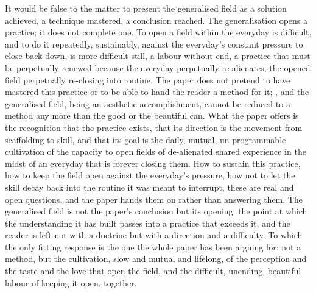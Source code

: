 It would be false to the matter to present the generalised field as a solution achieved, a technique mastered, a conclusion reached. The generalisation opens a practice; it does not complete one. To open a field within the everyday is difficult, and to do it repeatedly, sustainably, against the everyday's constant pressure to close back down, is more difficult still, a labour without end, a practice that must be perpetually renewed because the everyday perpetually re-alienates, the opened field perpetually re-closing into routine. The paper does not pretend to have mastered this practice or to be able to hand the reader a method for it; , and the generalised field, being an aesthetic accomplishment, cannot be reduced to a method any more than the good or the beautiful can. What the paper offers is the recognition that the practice exists, that its direction is the movement from scaffolding to skill, and that its goal is the daily, mutual, un-programmable cultivation of the capacity to open fields of de-alienated shared experience in the midst of an everyday that is forever closing them. How to sustain this practice, how to keep the field open against the everyday's pressure, how not to let the skill decay back into the routine it was meant to interrupt, these are real and open questions, and the paper hands them on rather than answering them. The generalised field is not the paper's conclusion but its opening: the point at which the understanding it has built passes into a practice that exceeds it, and the reader is left not with a doctrine but with a direction and a difficulty. To which the only fitting response is the one the whole paper has been arguing for: not a method, but the cultivation, slow and mutual and lifelong, of the perception and the taste and the love that open the field, and the difficult, unending, beautiful labour of keeping it open, together.
